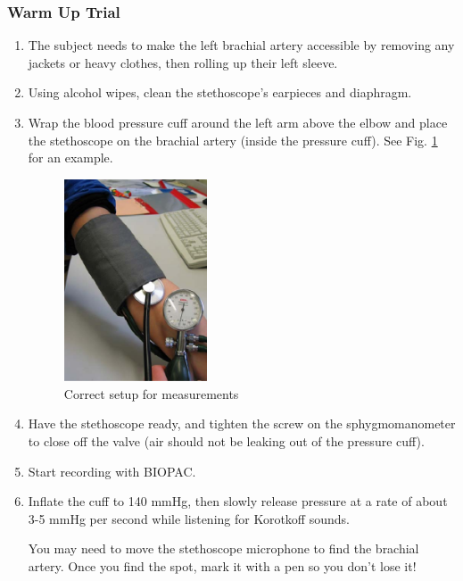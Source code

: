 \documentclass{article}
\begin{document}
\subsubsection*{Warm Up Trial}
\begin{enumerate}
	\item The subject needs to make the left brachial artery accessible by removing any jackets or heavy clothes, then rolling up their left sleeve.
	\item Using alcohol wipes, clean the stethoscope's earpieces and diaphragm.
	\item Wrap the blood pressure cuff around the left arm above the elbow and place the stethoscope on the brachial artery (inside the pressure cuff). See Fig. \ref{setup_2} for an example.
		\begin{figure}[h]
		\centering\includegraphics[width=0.4\textwidth]{../images/BP_6.jpg}
		\caption{Correct setup for measurements}
		\label{setup_2}
		\end{figure}
		
	\item Have the stethoscope ready, and tighten the screw on the sphygmomanometer to close off the valve (air should not be leaking out of the pressure cuff).
	\item Start recording with BIOPAC.
	\item Inflate the cuff to 140 mmHg, then slowly release pressure at a rate of about 3-5 mmHg per second while listening for Korotkoff sounds.
	\begin{info}
		You may need to move the stethoscope microphone to find the brachial artery. Once you find the spot, mark it with a pen so you don't lose it!
	\end{info}
	

\end{enumerate}
\end{document}
